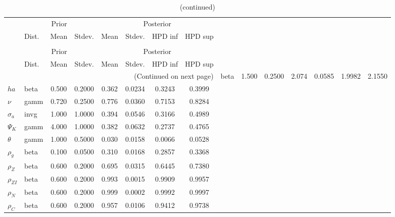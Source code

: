  
\begin{center}
\begin{longtable}{llcccccc} 
\caption{Results from Metropolis-Hastings (parameters)}
 \label{Table:MHPosterior:1}\\
\toprule 
  & \multicolumn{3}{c}{Prior}  &  \multicolumn{4}{c}{Posterior} \\
  \cmidrule(r{.75em}){2-4} \cmidrule(r{.75em}){5-8}
  & Dist. & Mean  & Stdev. & Mean & Stdev. & HPD inf & HPD sup\\
\midrule \endfirsthead 
\caption{(continued)}\\\toprule 
  & \multicolumn{3}{c}{Prior}  &  \multicolumn{4}{c}{Posterior} \\
  \cmidrule(r{.75em}){2-4} \cmidrule(r{.75em}){5-8}
  & Dist. & Mean  & Stdev. & Mean & Stdev. & HPD inf & HPD sup\\
\midrule \endhead 
\bottomrule \multicolumn{8}{r}{(Continued on next page)} \endfoot 
\bottomrule \endlastfoot 
${\gamma}$ & beta &   1.500 & 0.2500 &   2.074& 0.0585 &  1.9982 &  2.1550 \\ 
${ha}$ & beta &   0.500 & 0.2000 &   0.362& 0.0234 &  0.3243 &  0.3999 \\ 
$\nu$ & gamm &   0.720 & 0.2500 &   0.776& 0.0360 &  0.7153 &  0.8284 \\ 
${\sigma_a}$ & invg &   1.000 & 1.0000 &   0.394& 0.0546 &  0.3166 &  0.4989 \\ 
${\Psi_K}$ & gamm &   4.000 & 1.0000 &   0.382& 0.0632 &  0.2737 &  0.4765 \\ 
${\theta}$ & gamm &   1.000 & 0.5000 &   0.030& 0.0158 &  0.0066 &  0.0528 \\ 
${\rho_g}$ & beta &   0.100 & 0.0500 &   0.310& 0.0168 &  0.2857 &  0.3368 \\ 
${\rho_Z}$ & beta &   0.600 & 0.2000 &   0.695& 0.0315 &  0.6445 &  0.7380 \\ 
${\rho_{ZI}}$ & beta &   0.600 & 0.2000 &   0.993& 0.0015 &  0.9909 &  0.9957 \\ 
${\rho_N}$ & beta &   0.600 & 0.2000 &   0.999& 0.0002 &  0.9992 &  0.9997 \\ 
${\rho_C}$ & beta &   0.600 & 0.2000 &   0.957& 0.0106 &  0.9412 &  0.9738 \\ 
\end{longtable}
 \end{center}
